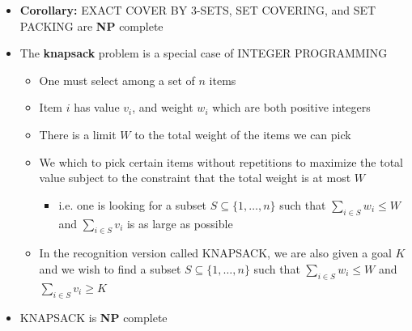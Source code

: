\documentclass[11pt]{article}
\begin{document}
\begin{itemize}
\item \textbf{Corollary:} EXACT COVER BY 3-SETS, SET COVERING, and SET PACKING are \textbf{NP} complete

\item The \textbf{knapsack} problem is a special case of INTEGER PROGRAMMING
\begin{itemize}
\item One must select among a set of \(n\) items
\item Item \(i\) has value \(v_i\), and weight \(w_i\) which are both positive integers
\item There is a limit \(W\) to the total weight of the items we can pick
\item We which to pick certain items without repetitions to maximize the total value subject to the constraint that the total weight is at most \(W\)
\begin{itemize}
\item i.e. one is looking for a subset \(S \subseteq \{1,\dots,n\}\) such that \(\sum_{i\in S} w_i \leq W\) and \(\sum_{i\in S}v_i\) is as large as possible
\end{itemize}
\item In the recognition version called KNAPSACK, we are also given a goal \(K\) and we wish to find a subset \(S \subseteq \{1,\dots, n\}\) such that \(\sum_{i\in S} w_i \leq W\) and \(\sum_{i\in S}v_i \geq K\)
\end{itemize}

\item KNAPSACK is \textbf{NP} complete
\end{itemize}
\end{document}
